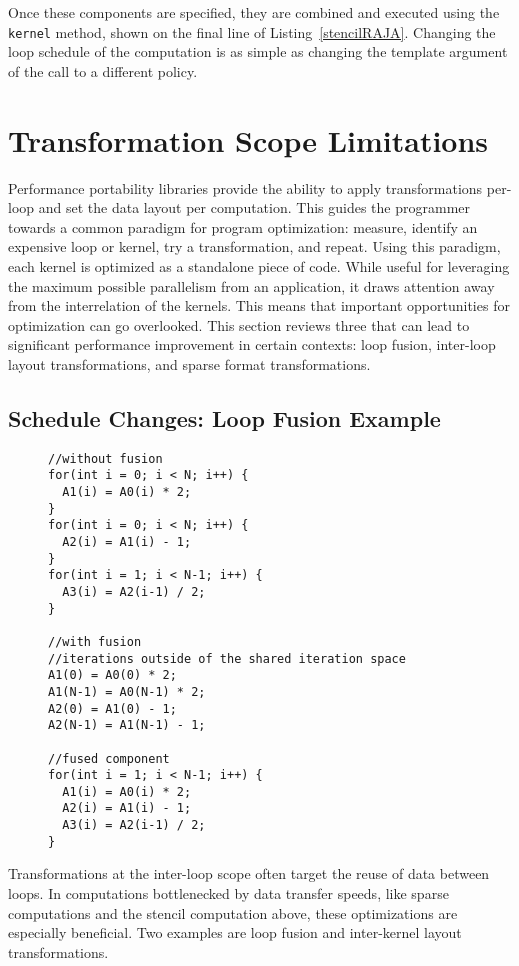 Once these components are specified, they are combined and executed using the \verb.kernel. method, shown on the final line of Listing~\ref{stencilRAJA}.
Changing the loop schedule of the computation is as simple as changing the template argument of the call to a different policy.

\section{Transformation Scope Limitations}

Performance portability libraries provide the ability to apply transformations per-loop and set the data layout per computation.
This guides the programmer towards a common paradigm for program optimization: measure, identify an expensive loop or kernel, try a transformation, and repeat.
Using this paradigm, each kernel is optimized as a standalone piece of code.
While useful for leveraging the maximum possible parallelism from an application, it draws attention away from the interrelation of the kernels.
This means that important opportunities for optimization can go overlooked.
This section reviews three that can lead to significant performance improvement in certain contexts: loop fusion, inter-loop layout transformations, and sparse format transformations.

\subsection{Schedule Changes: Loop Fusion Example}
\begin{figure}
\begin{lstlisting}[caption={Three loops, with and without loop fusion.},label=fusionExample]
//without fusion
for(int i = 0; i < N; i++) {
  A1(i) = A0(i) * 2;
}
for(int i = 0; i < N; i++) {
  A2(i) = A1(i) - 1;
}
for(int i = 1; i < N-1; i++) {
  A3(i) = A2(i-1) / 2;
}

//with fusion
//iterations outside of the shared iteration space
A1(0) = A0(0) * 2;
A1(N-1) = A0(N-1) * 2;
A2(0) = A1(0) - 1;
A2(N-1) = A1(N-1) - 1;

//fused component
for(int i = 1; i < N-1; i++) {
  A1(i) = A0(i) * 2;
  A2(i) = A1(i) - 1;
  A3(i) = A2(i-1) / 2;
}
\end{lstlisting}
\end{figure}

Transformations at the inter-loop scope often target the reuse of data between loops.
In computations bottlenecked by data transfer speeds, like sparse computations and the stencil computation above, these optimizations are especially beneficial. 
Two examples are loop fusion and inter-kernel layout transformations.

